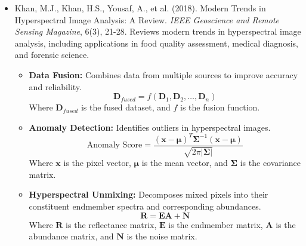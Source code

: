 \documentclass[10pt,svgnames,fragile]{beamer}
\begin{document}
\begin{frame}{}
\tiny
\begin{itemize}

   \item Khan, M.J., Khan, H.S., Yousaf, A., et al. (2018). Modern Trends in Hyperspectral Image Analysis: A Review. \textit{IEEE Geoscience and Remote Sensing Magazine}, 6(3), 21-28. \href{https://ieeexplore.ieee.org/document/8454602}{\color{blue}{DOI: 10.1109/MST.2018.2806959}}
    {\color{gray}Reviews modern trends in hyperspectral image analysis, including applications in food quality assessment, medical diagnosis, and forensic science.}
    \begin{itemize} \tiny
    \item \textbf{Data Fusion:} Combines data from multiple sources to improve accuracy and reliability.
    \[
    \mathbf{D}_{fused} = f(\mathbf{D}_1, \mathbf{D}_2, \ldots, \mathbf{D}_n)
    \]
    Where \( \mathbf{D}_{fused} \) is the fused dataset, and \( f \) is the fusion function.
    \item \textbf{Anomaly Detection:} Identifies outliers in hyperspectral images.
    \[
    \text{Anomaly Score} = \frac{(\mathbf{x} - \boldsymbol{\mu})^T \boldsymbol{\Sigma}^{-1} (\mathbf{x} - \boldsymbol{\mu})}{\sqrt{2 \pi |\boldsymbol{\Sigma}|}}
    \]
    Where \( \mathbf{x} \) is the pixel vector, \( \boldsymbol{\mu} \) is the mean vector, and \( \boldsymbol{\Sigma} \) is the covariance matrix.
    \item \textbf{Hyperspectral Unmixing:} Decomposes mixed pixels into their constituent endmember spectra and corresponding abundances.
    \[
    \mathbf{R} = \mathbf{EA} + \mathbf{N}
    \]
    Where \( \mathbf{R} \) is the reflectance matrix, \( \mathbf{E} \) is the endmember matrix, \( \mathbf{A} \) is the abundance matrix, and \( \mathbf{N} \) is the noise matrix.
\end{itemize}

\end{itemize}
\end{frame}
\end{document}
